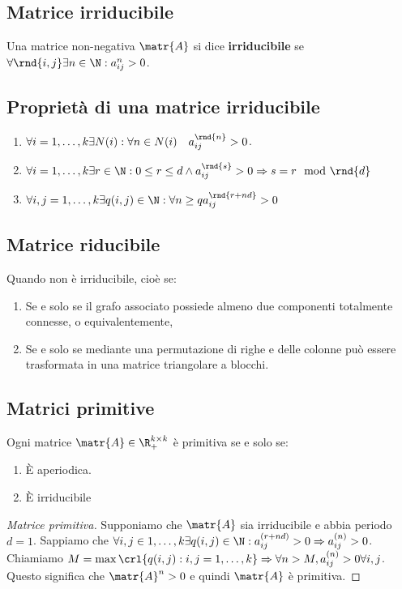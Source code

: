 \documentclass[\main/main.tex]{subfiles}
\begin{document}
\subsection{Matrice irriducibile}
Una matrice non-negativa \(\matr{A}\) si dice \textbf{irriducibile} se \(\forall \rnd{i,j} \exists n \in \N: a_{ij}^n > 0\).

\subsection{Proprietà di una matrice irriducibile}
\begin{enumerate}
  \item \(\forall i = 1, \ldots, k \exists N(i): \forall n \in N(i) \quad a_{ij}^{\rnd{n}} > 0\).
  \item \(\forall i = 1, \ldots, k \exists r \in \N: 0 \leq r \leq d \land a_{ij}^{\rnd{s}}>0 \Rightarrow s = r\mod\rnd{d}\)
  \item \(\forall i,j = 1, \ldots, k \exists q(i,j) \in \N: \forall n \geq q a_{ij}^{\rnd{r+nd}}>0\)
\end{enumerate}

\subsection{Matrice riducibile}
Quando non è irriducibile, cioè se:
\begin{enumerate}
  \item Se e solo se il grafo associato possiede almeno due componenti totalmente connesse, o equivalentemente,
  \item Se e solo se mediante una permutazione di righe e delle colonne può essere trasformata in una matrice triangolare a blocchi.
\end{enumerate}

\subsection{Matrici primitive}
\begin{definition}
  Ogni matrice \(\matr{A} \in \R^{k\times k}_{+}\) è primitiva se e solo se:
  \begin{enumerate}
    \item È aperiodica.
    \item È irriducibile
  \end{enumerate}
\end{definition}

\begin{proof}[Matrice primitiva]
  Supponiamo che \(\matr{A}\) sia irriducibile e abbia periodo \(d=1\). Sappiamo che \(\forall i,j \in 1, \ldots, k \exists q(i,j) \in \N: a_{ij}^{(r+nd)} >0 \Rightarrow a_{ij}^{(n)} > 0\).
  Chiamiamo \(M = \max\crl{q(i,j): i,j = 1, \ldots, k} \Rightarrow \forall n > M, a_{ij}^{(n)} > 0 \forall i,j\). Questo significa che \(\matr{A}^n>0\) e quindi \(\matr{A}\) è primitiva.
\end{proof}
\end{document}
